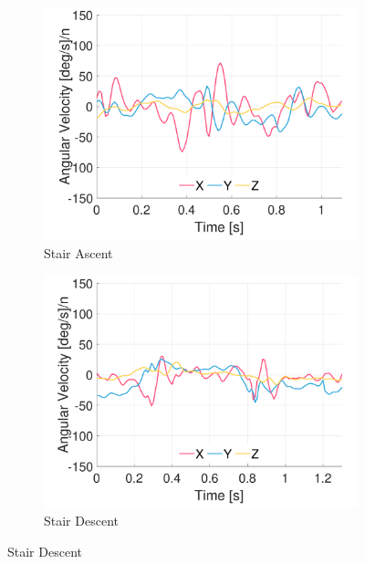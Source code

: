 \begin{figure}[p]
    \begin{subfigure}[b]{0.49\textwidth}
         \centering
         \includegraphics[width=\textwidth]{content/3-Methods/example-data/ch3_example_data_subject_01_chest_gyro_activity_stair_down.pdf}
         \caption{Stair Ascent}
    \end{subfigure}
    \begin{subfigure}[b]{0.49\textwidth}
         \centering
         \includegraphics[width=\textwidth]{content/3-Methods/example-data/ch3_example_data_subject_01_chest_gyro_activity_stair_up.pdf}
         \caption{Stair Descent}
    \end{subfigure}
    

\end{figure}

